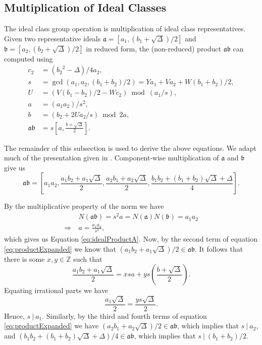 \documentclass{ucalgthes1}
\theoremstyle{definition}
\newcommand{\ZZ}{\mathbb{Z}}
\begin{document}
\subsection{Multiplication of Ideal Classes}
\label{subsec:idealMultiply}

The ideal class group operation is multiplication of ideal class representatives. Given two representative ideals $\mathfrak a = [a_1, (b_1 + \sqrt{\Delta})/2]$ and $\mathfrak b = [a_2, (b_2 + \sqrt{\Delta})/2]$ in reduced form, the (non-reduced) product $\mathfrak a \mathfrak b$ can computed using
\begin{align}
	c_2 & = ({b_2}^2-\Delta)/4a_2, \\
	s & = \gcd(a_1, a_2, (b_1+b_2)/2) = Ya_1 + Va_2 + W(b_1+b_2)/2,    \label{eq:idealProductS} \\
	U & = (V(b_1-b_2)/2 - Wc_2) \bmod{(a_1/s)},                        \label{eq:idealProductU} \\
	a & = (a_1a_2)/s^2,                                                \label{eq:idealProductA} \\
	b & = (b_2 + 2Ua_2/s) \bmod{2a},                                   \label{eq:idealProductB} \\
	\mathfrak a \mathfrak b & = s\left[a, \frac{b + \sqrt{\Delta}}{2}\right].
\end{align}

The remainder of this subsection is used to derive the above equations.  We adapt much of the presentation given in \cite[pp.117,118]{Jacobson2009}. Component-wise multiplication of $\mathfrak a$ and $\mathfrak b$ give us
\begin{equation}
\label{eq:productExpanded}
\mathfrak{a} \mathfrak{b} =
\left[ a_1a_2, \frac{a_1b_2 + a_1\sqrt{\Delta}}{2}, \frac{a_2b_1 + a_2\sqrt{\Delta}}{2}, \frac{b_1b_2 + (b_1+b_2)\sqrt{\Delta} + \Delta}{4} \right].
\end{equation}

\noindent
By the multiplicative property of the norm we have
\begin{align*}
	& N(\mathfrak{a}\mathfrak{b}) = s^2a = N(\mathfrak{a})N(\mathfrak{b}) = a_1 a_2 \\
	\Rightarrow~ & a = \frac{a_1a_2}{s^2},
\end{align*}
which gives us Equation \ref{eq:idealProductA}. Now, by the second term of equation \eqref{eq:productExpanded} we know that $(a_1b_2 + a_1\sqrt{\Delta})/2 \in \mathfrak{a}\mathfrak{b}$.  It follows that there is some $x,y \in \ZZ$ such that
\[
	\frac{a_1b_2 + a_1\sqrt{\Delta}}{2} = xsa + ys\left(\frac{b+\sqrt{\Delta}}{2}\right).
\]
Equating irrational parts we have
\begin{equation*}
	\frac{a_1\sqrt{\Delta}}{2} = \frac{ys\sqrt{\Delta}}{2}.
\end{equation*}
\noindent
Hence, $s ~|~ a_1$.  Similarly, by the third and fourth terms of equation \eqref{eq:productExpanded} we have $(a_2b_1+a_2\sqrt{\Delta})/2 \in \mathfrak{a}\mathfrak{b}$, which implies that $s~|~a_2$, and $(b_1b_2 + (b_1+b_2)\sqrt{\Delta} + \Delta)/4 \in \mathfrak{a}\mathfrak{b}$, which implies that $s~|~(b_1+b_2)/2$. 
\end{document}
